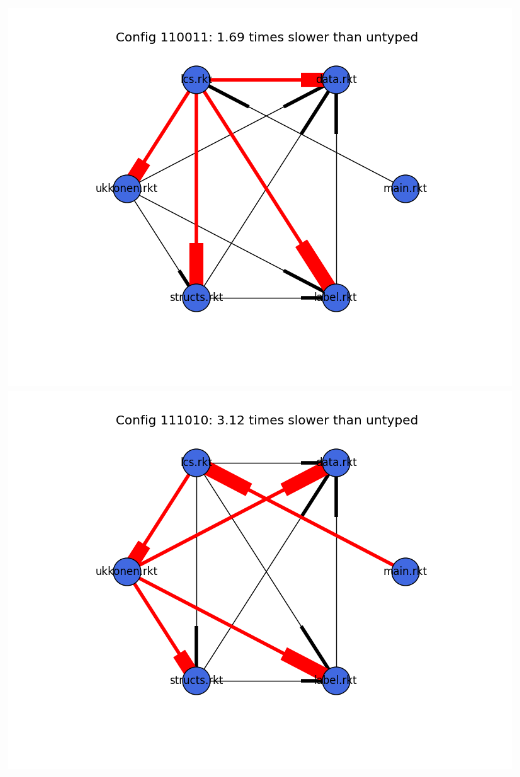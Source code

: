 \documentclass{article}
\begin{document}
\begin{itemize}
\includegraphics[width=\textwidth]{suffixtree-2015-04-02-module-graph-110011.png}
\includegraphics[width=\textwidth]{suffixtree-2015-04-02-module-graph-111010.png}
\end{itemize}
\end{document}
